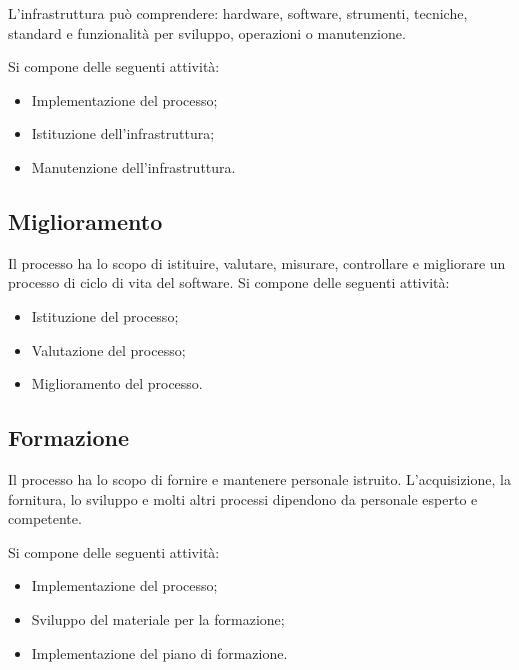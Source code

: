L'infrastruttura può comprendere: hardware, software, strumenti, tecniche, standard e funzionalità per sviluppo, operazioni o manutenzione.

Si compone delle seguenti attività:
\begin{itemize}
    \item Implementazione del processo;
    \item Istituzione dell'infrastruttura;
    \item Manutenzione dell'infrastruttura.
\end{itemize}

\subsection{Miglioramento}

Il processo ha lo scopo di istituire, valutare, misurare, controllare e migliorare un processo di ciclo di vita del software.
Si compone delle seguenti attività:
\begin{itemize}
    \item Istituzione del processo;
    \item Valutazione del processo;
    \item Miglioramento del processo.
\end{itemize}

\subsection{Formazione}

Il processo ha lo scopo di fornire e mantenere personale istruito. L'acquisizione, la fornitura, lo sviluppo e molti altri processi dipendono da personale esperto e competente.

Si compone delle seguenti attività:
\begin{itemize}
    \item Implementazione del processo;
    \item Sviluppo del materiale per la formazione;
    \item Implementazione del piano di formazione.
\end{itemize}

